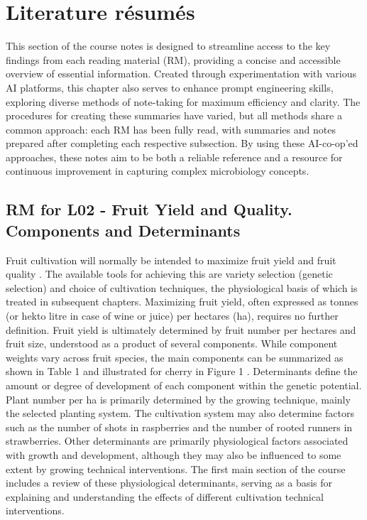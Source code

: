 \chapter{Literature résumés}
\setlength{\headheight}{12.71342pt}
\addtolength{\topmargin}{-0.71342pt}

This section of the course notes is designed to streamline access to the key findings from each reading material (RM), providing a concise and accessible overview of essential information. Created through experimentation with various AI platforms, this chapter also serves to enhance prompt engineering skills, exploring diverse methods of note-taking for maximum efficiency and clarity. The procedures for creating these summaries have varied, but all methods share a common approach: each RM has been fully read, with summaries and notes prepared after completing each respective subsection. By using these AI-co-op'ed approaches, these notes aim to be both a reliable reference and a resource for continuous improvement in capturing complex microbiology concepts.

\section{RM for L02 - Fruit Yield and Quality. Components and Determinants}

Fruit cultivation will normally be intended to maximize fruit yield and fruit quality \cite*{rm_01_L02_fruit_yield_quality}. The available tools for achieving this are variety selection (genetic selection) and choice of cultivation techniques, the physiological basis of which is treated in subsequent chapters. Maximizing fruit yield, often expressed as tonnes (or hekto litre in case of wine or juice) per hectares (ha), requires no further definition. Fruit yield is ultimately determined by fruit number per hectares and fruit size, understood as a product of several components. While component weights vary across fruit species, the main components can be summarized as shown in Table 1 and illustrated for cherry in Figure 1 \cite*{rm_01_L02_fruit_yield_quality}. Determinants define the amount or degree of development of each component within the genetic potential. Plant number per ha is primarily determined by the growing technique, mainly the selected planting system. The cultivation system may also determine factors such as the number of shots in raspberries and the number of rooted runners in strawberries. Other determinants are primarily physiological factors associated with growth and development, although they may also be influenced to some extent by growing technical interventions. The first main section of the course includes a review of these physiological determinants, serving as a basis for explaining and understanding the effects of different cultivation technical interventions.

